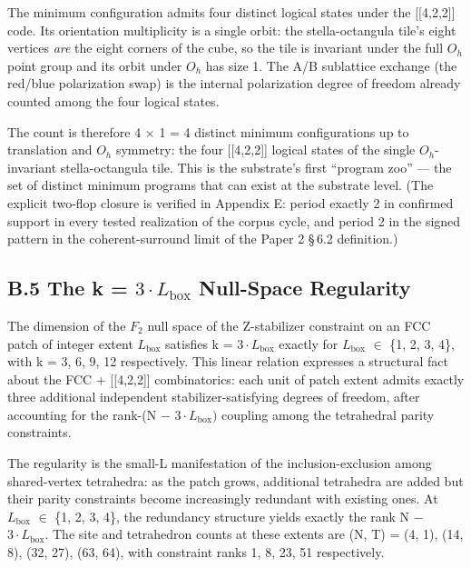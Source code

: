 \documentclass[11pt,oneside]{report}
\theoremstyle{definition}
\theoremstyle{remark}
\begin{document}
The minimum configuration admits four distinct logical states under the
[[4,2,2]] code. Its orientation multiplicity is a single orbit: the
stella-octangula tile's eight vertices \emph{are} the eight corners of the
cube, so the tile is invariant under the full \ensuremath{O_{h}} point group and its
orbit under \ensuremath{O_{h}} has size 1. The A/B sublattice exchange (the red/blue
polarization swap) is the internal polarization degree of freedom already
counted among the four logical states.

The count is therefore 4 \ensuremath{\times} 1 = 4 distinct minimum configurations up to
translation and \ensuremath{O_{h}} symmetry: the four [[4,2,2]] logical states of the
single \ensuremath{O_{h}}-invariant stella-octangula tile. This is the substrate's
first ``program zoo'' --- the set of distinct minimum programs that can
exist at the substrate level. (The explicit two-flop closure is verified in
Appendix E: period exactly 2 in confirmed support in every tested
realization of the corpus cycle, and period 2 in the signed pattern in the
coherent-surround limit of the Paper 2 \S\,6.2 definition.)

\subsection*{B.5 The k = \ensuremath{3\cdot L_{\mathrm{box}}} Null-Space Regularity}

The dimension of the \ensuremath{F_{2}} null space of the Z-stabilizer constraint on an
FCC patch of integer extent \ensuremath{L_{\mathrm{box}}} satisfies k = \ensuremath{3\cdot L_{\mathrm{box}}} exactly for
\ensuremath{L_{\mathrm{box}}} \ensuremath{\in} \{1, 2, 3, 4\}, with k = 3, 6, 9, 12 respectively. This linear
relation expresses a structural fact about the FCC + [[4,2,2]]
combinatorics: each unit of patch extent admits exactly three additional
independent stabilizer-satisfying degrees of freedom, after accounting
for the rank-(N \ensuremath{-} \ensuremath{3\cdot L_{\mathrm{box}})} coupling among the tetrahedral parity
constraints.

The regularity is the small-L manifestation of the inclusion-exclusion
among shared-vertex tetrahedra: as the patch grows, additional
tetrahedra are added but their parity constraints become increasingly
redundant with existing ones. At \ensuremath{L_{\mathrm{box}}} \ensuremath{\in} \{1, 2, 3, 4\}, the redundancy
structure yields exactly the rank N \ensuremath{-} \ensuremath{3\cdot L_{\mathrm{box}}.} The site and tetrahedron
counts at these extents are (N, T) = (4, 1), (14, 8), (32, 27), (63,
64), with constraint ranks 1, 8, 23, 51 respectively.
\end{document}
